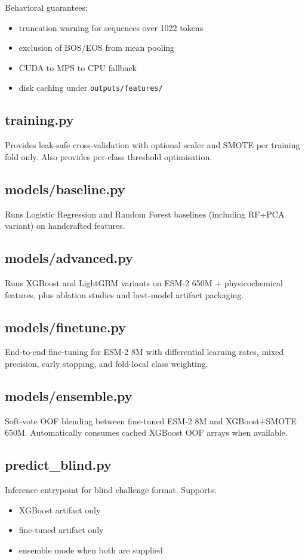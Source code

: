\documentclass[11pt,a4paper]{article}
\begin{document}
Behavioral guarantees:
\begin{itemize}
\item truncation warning for sequences over 1022 tokens
\item exclusion of BOS/EOS from mean pooling
\item CUDA to MPS to CPU fallback
\item disk caching under \texttt{outputs/features/}
\end{itemize}

\subsection{training.py}
Provides leak-safe cross-validation with optional scaler and SMOTE per training fold only.
Also provides per-class threshold optimisation.

\subsection{models/baseline.py}
Runs Logistic Regression and Random Forest baselines (including RF+PCA variant) on handcrafted features.

\subsection{models/advanced.py}
Runs XGBoost and LightGBM variants on ESM-2 650M + physicochemical features,
plus ablation studies and best-model artifact packaging.

\subsection{models/finetune.py}
End-to-end fine-tuning for ESM-2 8M with differential learning rates, mixed precision,
early stopping, and fold-local class weighting.

\subsection{models/ensemble.py}
Soft-vote OOF blending between fine-tuned ESM-2 8M and XGBoost+SMOTE 650M.
Automatically consumes cached XGBoost OOF arrays when available.

\subsection{predict\_blind.py}
Inference entrypoint for blind challenge format. Supports:
\begin{itemize}
\item XGBoost artifact only
\item fine-tuned artifact only
\item ensemble mode when both are supplied
\end{itemize}
\end{document}

